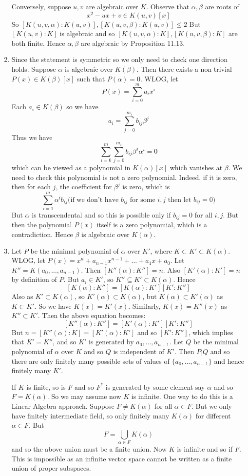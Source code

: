 \begin{enumerate}
    Conversely, suppose $u,v$ are algebraic over $K$. Observe that $\alpha,\beta$ are roots of
    $$x^2-ux+v \in K(u,v)[x]$$
    So $[K(u,v,\alpha):K(u,v)],[K(u,v,\beta):K(u,v)] \le 2$
    But $[K(u,v):K]$ is algebraic and so
    $[K(u,v,\alpha):K],[K(u,v,\beta):K]$ are both finite.
    Hence $\alpha,\beta$ are algebraic by Proposition 11.13.\\
\item Since the statement is symmetric so we only need to check one direction holds. Suppose $\alpha$ is algebraic over $K(\beta)$. Then there exists a non-trivial $P(x) \in K(\beta)[x]$ such that $P(\alpha)=0$. WLOG, let
    $$P(x)=\sum_{i=0}^m a_i x^i$$ Each $a_i \in K(\beta)$ so we have
    $$a_i=\sum_{j=0}^{m_i} b_{ij} \beta^j$$
    Thus we have
    $$\sum_{i=0}^m \sum_{j=0}^{m_i} b_{ij} \beta^j \alpha^i =0$$ which can be viewed as a polynomial in
    $K(\alpha)[x]$ which vanishes at $\beta$. We need to check this polynomial is not a zero polynomial. Indeed, if it is zero, then for each $j$, the coefficient for $\beta^j$ is zero, which is
    $$\sum_{i=1}^m \alpha^i b_{ij} \text{(if we don't have $b_{ij}$ for some $i,j$ then let $b_{ij}=0$)}$$
    But $\alpha$ is transcendental and so this is possible only if $b_{ij}=0$ for all $i,j$. But then the polynomial $P(x)$ itself is a zero polynomial, which is a contradiction. Hence $\beta$ is algebraic over $K(\alpha)$.\\
\item Let $P$ be the minimal polynomial of $\alpha$ over $K'$, where $K \subset K' \subset K(\alpha)$. WLOG, let $P(x)=x^n+a_{n-1}x^{n-1}+\ldots+a_1 x+a_0$. Let $K''=K(a_0,\ldots,a_{n-1})$.
    Then $[K''(\alpha):K'']=n$. Also $[K'(\alpha):K']=n$ by definition of $P$. But $a_i \in K'$, so $K'' \subseteq K' \subset K(\alpha)$. Hence
    $$[K(\alpha):K'']=[K(\alpha):K'][K':K'']$$
    Also as $K' \subset K(\alpha)$, so $K'(\alpha) \subset K(\alpha)$, but $K(\alpha) \subset K'(\alpha)$ as
    $K \subset K'$. So we have $K(x)=K'(x)$. Similarly, $K(x)=K''(x)$ as $K'' \subset K'$.
    Then the above equation becomes:
    $$[K''(\alpha):K'']=[K'(\alpha):K'][K':K'']$$ But $n=[K''(\alpha):K]=[K'(\alpha):K']$ and so $[K':K'']$, which implies that $K'=K''$, and so $K'$ is generated by $a_0,\ldots,a_{n-1}$. Let $Q$ be the minimal polynomial of $\alpha$ over $K$ and so $Q$ is independent of $K'$. Then $P|Q$ and so there are only finitely many possible sets of values of $\{a_0,\ldots,a_{n-1}\}$ and hence finitely many $K'$.

    If $K$ is finite, so is $F$ and so $F^*$ is generated by some element say $\alpha$ and so $F=K(\alpha)$.
    So we may assume now $K$ is infinite. One way to do this is a Linear Algebra approach. Suppose $F \neq K(\alpha)$ for all $\alpha \in F$. But we only have finitely intermediate field, so only finitely many
    $K(\alpha)$ for different $\alpha \in F$. But
    $$F=\bigcup_{\alpha \in F}K(\alpha)$$ and so the above union must be a finite union. Now $K$ is infinite and so if $F$. This is impossible as an infinite vector space cannot be written as a finite union of proper subspaces.


\end{enumerate}
